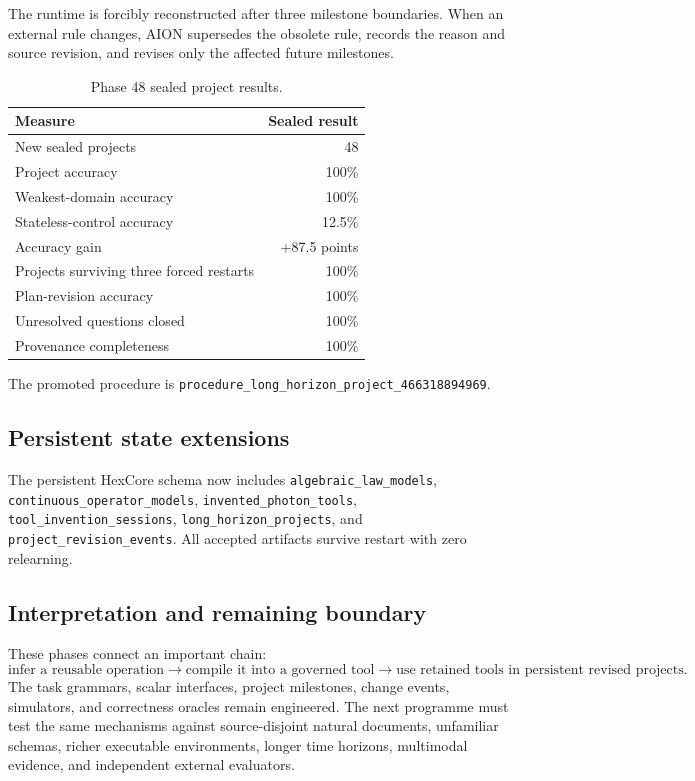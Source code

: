 The runtime is forcibly reconstructed after three milestone boundaries.  When an external rule changes, AION supersedes the obsolete rule, records the reason and source revision, and revises only the affected future milestones.

\begin{table}[ht]
\centering
\begin{tabular}{lr}
\hline
Measure & Sealed result\\
\hline
New sealed projects & 48\\
Project accuracy & 100\%\\
Weakest-domain accuracy & 100\%\\
Stateless-control accuracy & 12.5\%\\
Accuracy gain & +87.5 points\\
Projects surviving three forced restarts & 100\%\\
Plan-revision accuracy & 100\%\\
Unresolved questions closed & 100\%\\
Provenance completeness & 100\%\\
\hline
\end{tabular}
\caption{Phase 48 sealed project results.}
\end{table}

The promoted procedure is
\texttt{procedure\_long\_horizon\_project\_466318894969}.

\subsection{Persistent state extensions}

The persistent HexCore schema now includes
\texttt{algebraic\_law\_models},
\texttt{continuous\_operator\_models},
\texttt{invented\_photon\_tools},
\texttt{tool\_invention\_sessions},
\texttt{long\_horizon\_projects}, and
\texttt{project\_revision\_events}.
All accepted artifacts survive restart with zero relearning.

\subsection{Interpretation and remaining boundary}

These phases connect an important chain:
\[
\text{infer a reusable operation}
\rightarrow
\text{compile it into a governed tool}
\rightarrow
\text{use retained tools in persistent revised projects}.
\]
The task grammars, scalar interfaces, project milestones, change events, simulators, and correctness oracles remain engineered.  The next programme must test the same mechanisms against source-disjoint natural documents, unfamiliar schemas, richer executable environments, longer time horizons, multimodal evidence, and independent external evaluators.
